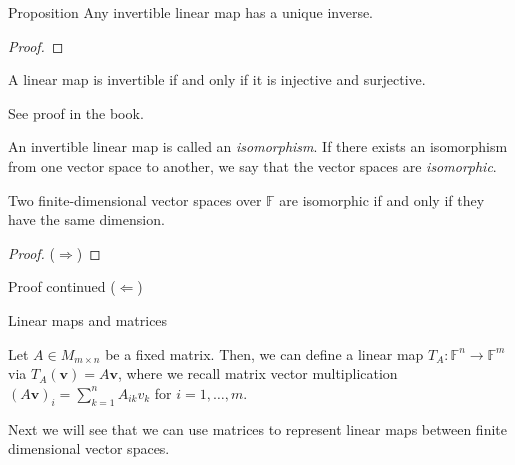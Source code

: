 \documentclass [aspectratio=169]{beamer}
\newcommand{\bv}{{\mathbf{v}}}
\newcommand{\F}{{\mathbb{F}}}
\begin{document}
\begin{frame}
\begin{exampleblock}{Proposition}
Any invertible linear map has a unique inverse.
\end{exampleblock}
\begin{proof}
\vspace{4cm}
\end{proof}


\end{frame}

\begin{frame}

\begin{theorem}
A linear map is invertible if and only if it is injective and surjective.
\end{theorem}

See proof in the book.

\begin{definition}
An invertible linear map is called an \emph{isomorphism}. If there exists an isomorphism from one vector space to another, we say that the vector spaces are \emph{isomorphic}.
\end{definition}
\end{frame}

\begin{frame}
\begin{theorem}
Two finite-dimensional vector spaces over $\F$ are isomorphic if and only if they have the same dimension.
\end{theorem}
\begin{proof}
($\Rightarrow$) 

\vspace{4cm}

\end{proof}

\end{frame}

\begin{frame}
\begin{block}{Proof continued}
($\Leftarrow$) 
\vspace{4cm}
\end{block}
\end{frame}



\begin{frame}{Linear maps and matrices}
\begin{example}
Let $A\in M_{m\times n}$ be a fixed matrix. Then, we can define a linear map $T_A \colon \F^n \to \F^m$ via $T_A(\bv) = A \bv$, where we recall matrix vector multiplication $(A\bv)_i = \sum_{k=1}^n A_{ik}v_k$ for $i=1, \ldots, m$.
\end{example}

Next we will see that we can use matrices to represent linear maps between finite dimensional vector spaces. 

\end{frame}
\end{document}
